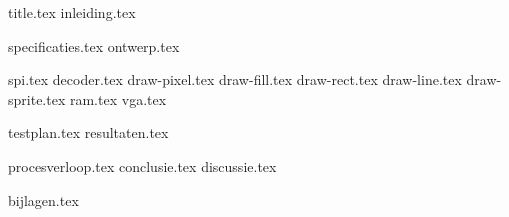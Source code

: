 \documentclass[final]{scrreprt}
\date{22 november 2013}
\begin{document}

{title.tex}
{inleiding.tex}
\newpage

\tableofcontents

\newpage
{}

{specificaties.tex}
{ontwerp.tex}

{spi.tex}
{decoder.tex}
{draw-pixel.tex}
{draw-fill.tex}
{draw-rect.tex}
{draw-line.tex}
{draw-sprite.tex}
{ram.tex}
{vga.tex}

{testplan.tex}
{resultaten.tex}

{procesverloop.tex}
{conclusie.tex}
{discussie.tex}

\newpage
{}

\printbibliography
{bijlagen.tex}
\end{document}
